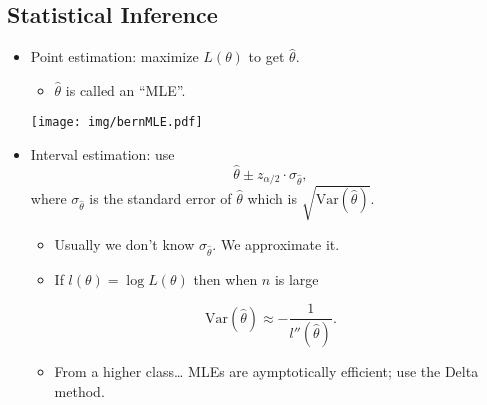 \documentclass[captions=tableheading]{scrbook}
\begin{document}
\subsection{Statistical Inference}
\label{sec-1_1_2}
\begin{itemize}

\item Point estimation: maximize $L(\theta)$ to get $\hat{\theta}$.\\
\label{sec-1_1_2_1}%
\begin{itemize}
\item \(\hat{\theta}\) is called an ``MLE''.
\end{itemize}

\begin{center}

\texttt{[image: img/bernMLE.pdf]}

\end{center}


\item Interval estimation: use\\
\label{sec-1_1_2_2}%
\[
\hat{\theta} \pm z_{\alpha/2}\cdot \sigma_{\hat{\theta}},
\]
where $\sigma_{\hat{\theta}}$ is the standard error of $\hat{\theta}$ which is $\sqrt{\mathrm{Var}(\hat{\theta})}$.  


\begin{itemize}
\item Usually we don't know $\sigma_{\hat{\theta}}$.  We approximate it.
\item If $l(\theta) = \log L(\theta)$ then when $n$ is large
\end{itemize}
\[
\mathrm{Var}(\hat{\theta}) \approx -\frac{1}{l''(\hat{\theta})}.
\]


\begin{itemize}
\item From a higher class\ldots{} MLEs are aymptotically efficient; use the Delta method.
\end{itemize}

\end{itemize} %
\end{document}
